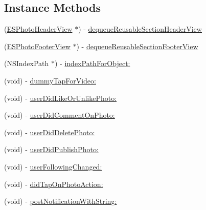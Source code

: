 \subsection*{Instance Methods}
\begin{DoxyCompactItemize}
\item 
(\hyperlink{interface_e_s_photo_header_view}{E\+S\+Photo\+Header\+View} $\ast$) -\/ \hyperlink{interface_e_s_photo_timeline_view_controller_a7fb71efdeb9e2fc876ac6efd1c8cd672}{dequeue\+Reusable\+Section\+Header\+View}
\item 
(\hyperlink{interface_e_s_photo_footer_view}{E\+S\+Photo\+Footer\+View} $\ast$) -\/ \hyperlink{interface_e_s_photo_timeline_view_controller_aea3af8706e136c64c40d3f621c3c582d}{dequeue\+Reusable\+Section\+Footer\+View}
\item 
(N\+S\+Index\+Path $\ast$) -\/ \hyperlink{interface_e_s_photo_timeline_view_controller_a497b3068fc0ae04d96dcecf3d8df2bc1}{index\+Path\+For\+Object\+:}
\item 
(void) -\/ \hyperlink{interface_e_s_photo_timeline_view_controller_ae718c082cafda11e43706dbc5a16aae4}{dummy\+Tap\+For\+Video\+:}
\item 
(void) -\/ \hyperlink{interface_e_s_photo_timeline_view_controller_a49bd117a5cbed7962dadf15f2e705be7}{user\+Did\+Like\+Or\+Unlike\+Photo\+:}
\item 
(void) -\/ \hyperlink{interface_e_s_photo_timeline_view_controller_a61b6812d2cd0e0341460bc0c9bee6f95}{user\+Did\+Comment\+On\+Photo\+:}
\item 
(void) -\/ \hyperlink{interface_e_s_photo_timeline_view_controller_a9cdee2b5688cd0244694950dba86be54}{user\+Did\+Delete\+Photo\+:}
\item 
(void) -\/ \hyperlink{interface_e_s_photo_timeline_view_controller_ab45ec528b1671dc7bd046873b1a33eb7}{user\+Did\+Publish\+Photo\+:}
\item 
(void) -\/ \hyperlink{interface_e_s_photo_timeline_view_controller_a43762f8846bc52847c49a698ea1fb544}{user\+Following\+Changed\+:}
\item 
(void) -\/ \hyperlink{interface_e_s_photo_timeline_view_controller_a4f7135649cd7aca14506a9849bc14260}{did\+Tap\+On\+Photo\+Action\+:}
\item 
(void) -\/ \hyperlink{interface_e_s_photo_timeline_view_controller_a1bb75368271e98ffe060907a77234046}{post\+Notification\+With\+String\+:}
\end{DoxyCompactItemize}
